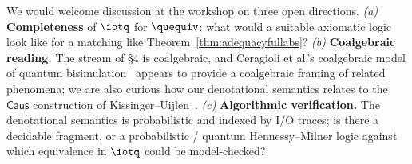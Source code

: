We would welcome discussion at the workshop on three open directions. \emph{(a)} \textbf{Completeness} of $\iotq$ for $\quequiv$: what would a suitable axiomatic logic look like for a matching like Theorem~\ref{thm:adequacyfullabs}? \emph{(b)} \textbf{Coalgebraic reading.} The stream of \S4 is coalgebraic, and Ceragioli et al.'s coalgebraic model of quantum bisimulation~\cite{ceragiolicoalgebraic} appears to provide a coalgebraic framing of related phenomena; we are also curious how our denotational semantics relates to the $\mathsf{Caus}$ construction of Kissinger--Uijlen~\cite{kissinger2019categorical}. \emph{(c)} \textbf{Algorithmic verification.} The denotational semantics is probabilistic and indexed by I/O traces; is there a decidable fragment, or a probabilistic / quantum Hennessy--Milner logic against which equivalence in $\iotq$ could be model-checked?
